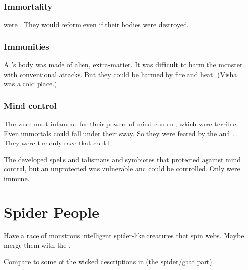 \subsubsection{Immortality}
\Shugul were . 
They would reform even if their bodies were destroyed. 





\subsubsection{Immunities}
A \shugul's body was made of alien, extra-\Miithian matter. 
It was difficult to harm the monster with conventional attacks. 
But they could be harmed by fire and heat. 
(Visha was a cold place.)





\subsubsection{Mind control}
The \shugul were most infamous for their powers of mind control, which were terrible.
Even immortals could fall under their sway. 
So they were feared by the \ophidians and \resphain.
They were the only race that could .

The \ophidians developed spells and talismans and symbiotes that protected against \shugul mind control, but an unprotected \ophidian was vulnerable and could be controlled.
Only \dragons were immune. 
















\section{Spider People}
Have a race of monstrous intelligent spider-like creatures that spin webs. 
Maybe merge them with the . 

Compare to some of the wicked descriptions in \cite{Cracked:GeneticExperiments} (the spider/goat part). 
















